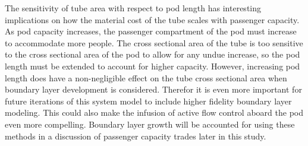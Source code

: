 The sensitivity of tube area with respect to pod length has interesting implications on how the material cost of the tube
scales with passenger capacity. As pod capacity increases, the passenger compartment of the pod
must increase to accommodate more people. The cross sectional area of the tube is too sensitive to the cross sectional
area of the pod to allow for any undue increase, so the pod length must be extended to account for higher capacity.
However, increasing pod length does have a non-negligible effect on the tube cross sectional area when boundary layer
development is considered. Therefor it is even more important for future iterations of this system model to include
higher fidelity boundary layer modeling. This could also make the infusion of active flow control aboard
the pod even more compelling. Boundary layer growth will be accounted for using these methods in a discussion of
passenger capacity trades later in this study.
